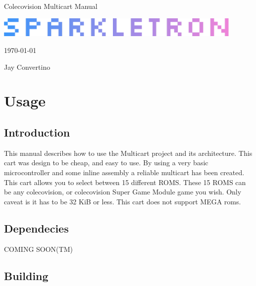 \documentclass{article}
\begin{document}
  \begin{titlepage}
    \begin{center}

    {\Huge Colecovision Multicart Manual}

    \vspace{25mm}

    \includegraphics[width=0.90\textwidth,height=\textheight,keepaspectratio]{src/img/SPARKLETRON.png}

    \vspace{25mm}

    \today

    \vspace{15mm}

    {\Large Jay Convertino}

    \end{center}
  \end{titlepage}

  \tableofcontents

  \newpage

  \section{Usage}

  \subsection{Introduction}

  \par
  This manual describes how to use the Multicart project and its architecture. This cart was design to be cheap, and easy to use.
  By using a very basic microcontroller and some inline assembly a reliable multicart has been created. This cart allows you to
  select between 15 different ROMS. These 15 ROMS can be any colecovision, or colecovision Super Game Module game you wish. Only
  caveat is it has to be 32 KiB or less. This cart does not support MEGA roms.

  \subsection{Dependecies}

  \par
  COMING SOON(TM)

  \subsection{Building}
\end{document}
